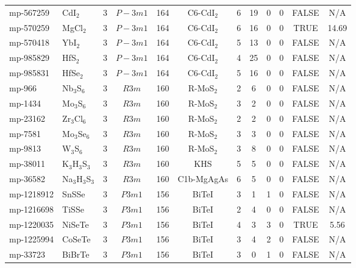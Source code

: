 {\begin{longtable}{llcccccccccc}
    mp-567259 & CdI$_{2}$ & 3     & $P-3m1$ & 164   & C6-CdI$_{2}$ & 6     & 19    & 0     & 0     & FALSE & N/A \\
    mp-570259 & MgCl$_{2}$ & 3     & $P-3m1$ & 164   & C6-CdI$_{2}$ & 6     & 16    & 0     & 0     & TRUE  & 14.69  \\
    mp-570418 & YbI$_{2}$ & 3     & $P-3m1$ & 164   & C6-CdI$_{2}$ & 5     & 13    & 0     & 0     & FALSE & N/A \\
    mp-985829 & HfS$_{2}$ & 3     & $P-3m1$ & 164   & C6-CdI$_{2}$ & 4     & 25    & 0     & 0     & FALSE & N/A \\
    mp-985831 & HfSe$_{2}$ & 3     & $P-3m1$ & 164   & C6-CdI$_{2}$ & 5     & 16    & 0     & 0     & FALSE & N/A \\
    mp-966 & Nb$_{3}$S$_{6}$ & 3     & $R3m$ & 160   & R-MoS$_{2}$ & 2     & 6     & 0     & 0     & FALSE & N/A \\
    mp-1434 & Mo$_{3}$S$_{6}$ & 3     & $R3m$ & 160   & R-MoS$_{2}$ & 3     & 2     & 0     & 0     & FALSE & N/A \\
    mp-23162 & Zr$_{3}$Cl$_{6}$ & 3     & $R3m$ & 160   & R-MoS$_{2}$ & 2     & 2     & 0     & 0     & FALSE & N/A \\
    mp-7581 & Mo$_{3}$Se$_{6}$ & 3     & $R3m$ & 160   & R-MoS$_{2}$ & 3     & 3     & 0     & 0     & FALSE & N/A \\
    mp-9813 & W$_{3}$S$_{6}$ & 3     & $R3m$ & 160   & R-MoS$_{2}$ & 3     & 8     & 0     & 0     & FALSE & N/A \\
    mp-38011 & K$_{3}$H$_{3}$S$_{3}$ & 3     & $R3m$ & 160   & KHS   & 5     & 5     & 0     & 0     & FALSE & N/A \\
    mp-36582 & Na$_{3}$H$_{3}$S$_{3}$ & 3     & $R3m$ & 160   & C1b-MgAgAs & 6     & 5     & 0     & 0     & FALSE & N/A \\
    mp-1218912 & SnSSe & 3     & $P3m1$ & 156   & BiTeI & 3     & 1     & 1     & 0     & FALSE & N/A \\
    mp-1216698 & TiSSe & 3     & $P3m1$ & 156   & BiTeI & 2     & 4     & 0     & 0     & FALSE & N/A \\
    mp-1220035 & NiSeTe & 3     & $P3m1$ & 156   & BiTeI & 4     & 3     & 3     & 0     & TRUE  & 5.56  \\
    mp-1225994 & CoSeTe & 3     & $P3m1$ & 156   & BiTeI & 3     & 4     & 2     & 0     & FALSE & N/A \\
    mp-33723 & BiBrTe & 3     & $P3m1$ & 156   & BiTeI & 3     & 0     & 1     & 0     & FALSE & N/A \\

\end{longtable}}
